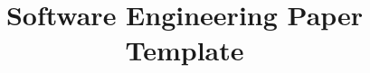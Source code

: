 \documentclass[sigconf,review,anonymous]{acmart}
\begin{document}


\title{Software Engineering Paper Template}




\begin{abstract}

\end{abstract}


\end{document}
